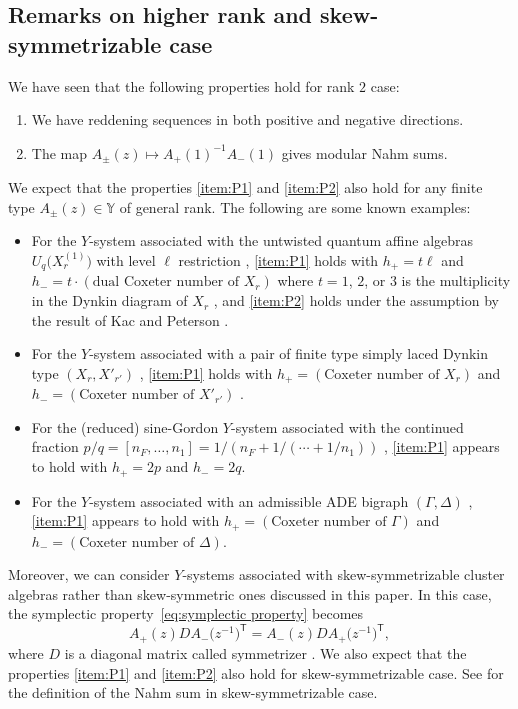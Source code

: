 \documentclass[10pt,a4paper]{amsart}
\numberwithin{equation}{section}
\theoremstyle{definition}
\begin{document}
\subsection{Remarks on higher rank and skew-symmetrizable case}
\label{section:comments}
We have seen that the following properties hold for rank $2$ case:
\begin{enumerate}[label=(P\arabic*)]\itemsep=0pt
 \item \label{item:P1} We have reddening sequences in both positive and negative directions.
 \item \label{item:P2} The map $A_\pm(z) \mapsto A_+ (1)^{-1} A_- (1)$ gives modular Nahm sums.
\end{enumerate}
We expect that the properties \ref{item:P1} and \ref{item:P2} also hold for any finite
type $A_\pm (z) \in \mathbb{Y}$ of general rank. The following are some known examples:
\begin{itemize}\itemsep=0pt
 \item For the $Y$-system associated with the untwisted quantum affine algebras $U_q\bigl(X_r^{(1)}\bigr)$
 with level $\ell$ restriction \cite{KunibaNakanishi92},
 \ref{item:P1} holds with $h_+ = t \ell$ and $h_- = t \cdot (\text{dual Coxeter number of $X_r$})$
 where $t = 1$, $2$, or $3$ is the multiplicity in the Dynkin diagram of $X_r$ \cite{IIKKNa,IIKKNb}, and
 \ref{item:P2} holds under the assumption \cite[Conjecture 5.3]{HKOTT} by the
 result of Kac and Peterson \cite{KacPet}.
 \item For the $Y$-system associated with a pair of finite type simply laced Dynkin type $(X_r, X'_{r'})$ \cite{RVT},
 \ref{item:P1} holds with $h_+ = (\text{Coxeter number of $X_r$})$ and $h_- = (\text{Coxeter number of $X'_{r'}$})$ \cite{Keller2011, Keller}.
 \item For the (reduced) sine-Gordon $Y$-system associated with the continued fraction
 $p/q = [n_F, \dots, n_1] = 1/ (n_F + 1/ (\cdots + 1/ n_1))$ \cite{NakanishiStella, Tateo},
 \ref{item:P1} appears to hold with $h_+ = 2 p$ and $h_- = 2 q$.
 \item For the $Y$-system associated with an admissible ADE bigraph $(\Gamma, \Delta)$ \cite{GalashinPylyavskyy},
 \ref{item:P1} appears to hold with $h_+ = (\text{Coxeter number of $\Gamma$})$ and
 $h_- = (\text{Coxeter number of $\Delta$})$.
\end{itemize}

Moreover, we can consider $Y$-systems associated with skew-symmetrizable cluster algebras rather than skew-symmetric ones
discussed in this paper. In this case, the symplectic property~\eqref{eq:symplectic property} becomes
\begin{equation*}
 A_+ (z) D A_-\bigl(z^{-1}\bigr)^{\mathsf{T}} = A_- (z) D A_+ \bigl(z^{-1}\bigr)^{\mathsf{T}},
\end{equation*}
where $D$ is a diagonal matrix called symmetrizer \cite{mizuno2020difference}.
We also expect that the properties \ref{item:P1} and \ref{item:P2} also hold for skew-symmetrizable case.
See \cite[Definition 5.12]{mizuno2020difference} for the definition of the Nahm sum in skew-symmetrizable case.
\end{document}

